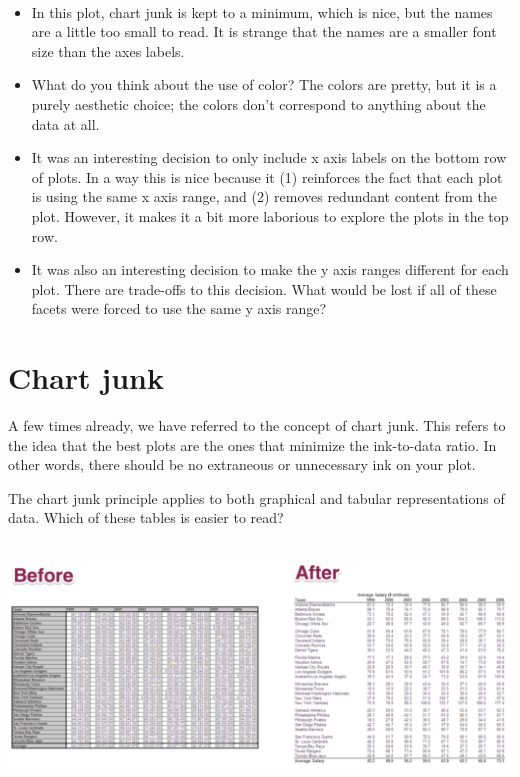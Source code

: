 \documentclass[
]{book}
\begin{document}
~

\begin{itemize}
\item
  In this plot, chart junk is kept to a minimum, which is nice, but the names are a little too small to read. It is strange that the names are a smaller font size than the axes labels.
\item
  What do you think about the use of color? The colors are pretty, but it is a purely aesthetic choice; the colors don't correspond to anything about the data at all.
\item
  It was an interesting decision to only include x axis labels on the bottom row of plots. In a way this is nice because it (1) reinforces the fact that each plot is using the same x axis range, and (2) removes redundant content from the plot. However, it makes it a bit more laborious to explore the plots in the top row.
\item
  It was also an interesting decision to make the y axis ranges different for each plot. There are trade-offs to this decision. What would be lost if all of these facets were forced to use the same y axis range?
\end{itemize}

\hypertarget{chart-junk}{%
\section*{Chart junk}\label{chart-junk}}

A few times already, we have referred to the concept of chart junk. This refers to the idea that the best plots are the ones that minimize the ink-to-data ratio. In other words, there should be no extraneous or unnecessary ink on your plot.

The chart junk principle applies to both graphical and tabular representations of data. Which of these tables is easier to read?

~\\

\includegraphics{img/vis17.png}
\end{document}
